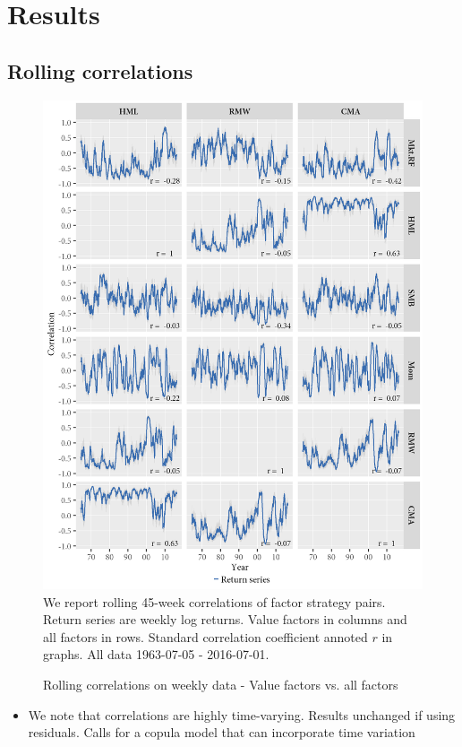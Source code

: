\section{Results}
\subsection{Rolling correlations}
\begin{figure}[H]
  \caption{Rolling correlations on weekly data - Value factors vs. all factors}
  \label{diag:rolling45}
  \toprule
  \centering
  \begin{minipage}{\textwidth}
  \includegraphics[scale=1]{graphics/rolling45.png}  
  \bottomrule
  \vspace{3mm}
  \footnotesize
  We report rolling 45-week correlations of factor strategy pairs. Return series are weekly log returns. Value factors in columns and all factors in rows. Standard correlation coefficient annoted $r$ in graphs. All data 1963-07-05 - 2016-07-01.
  \end{minipage}
\end{figure}
\begin{itemize}
  \item We note that correlations are highly time-varying. Results unchanged if using residuals. Calls for a copula model that can incorporate time variation
\end{itemize}
